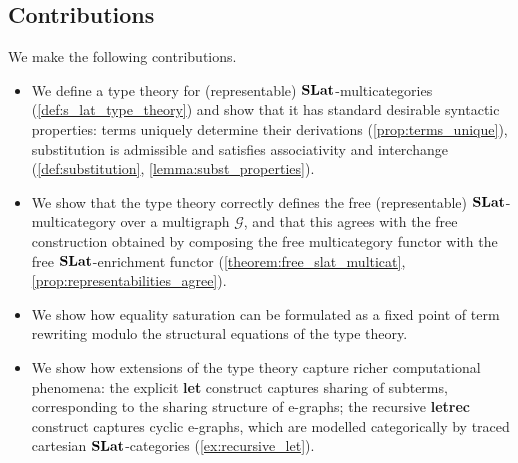 \documentclass[manuscript, nonacm, anonymous]{acmart}
\begin{document}
\subsection{Contributions}

We make the following contributions.

\begin{itemize}
  \item We define a type theory for (representable) $\mathbf{SLat}$-multicategories
  (\autoref{def:s_lat_type_theory}) and show that it has standard desirable
  syntactic properties: terms uniquely determine their derivations
  (\autoref{prop:terms_unique}), substitution is admissible and satisfies
  associativity and interchange (\autoref{def:substitution},
  \autoref{lemma:subst_properties}).

  \item We show that the type theory correctly defines the free (representable)
  $\mathbf{SLat}$-multicategory over a multigraph $\mathcal{G}$, and that this
  agrees with the free construction obtained by composing the free multicategory
  functor with the free $\mathbf{SLat}$-enrichment functor
  (\autoref{theorem:free_slat_multicat}, \autoref{prop:representabilities_agree}).

  \item We show how equality saturation can be formulated as a fixed point of
  term rewriting modulo the structural equations of the type theory.

  \item We show how extensions of the type theory capture richer computational
  phenomena: the explicit \textbf{let} construct captures sharing of subterms,
  corresponding to the sharing structure of e-graphs; the recursive
  \textbf{letrec} construct captures cyclic e-graphs, which are modelled
  categorically by traced cartesian $\mathbf{SLat}$-categories
  (\autoref{ex:recursive_let}).
\end{itemize}









\appendix

\end{document}
